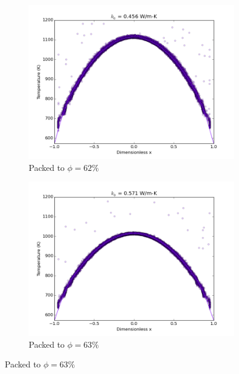 \begin{figure}[!ht]
    \centering
    \begin{subfigure}[b]{0.4\textwidth}
        \centering
        \includegraphics[width=\textwidth]{figures/initial_packing_study/62percent-deform-packing.png}
        \caption{Packed to $\phi = 62\%$}
    \end{subfigure}
    
    \begin{subfigure}[b]{0.4\textwidth}
        \centering
        \includegraphics[width=\textwidth]{figures/initial_packing_study/63percent-deform-packing.png}
        \caption{Packed to $\phi = 63\%$}
    \end{subfigure}


\end{figure}
